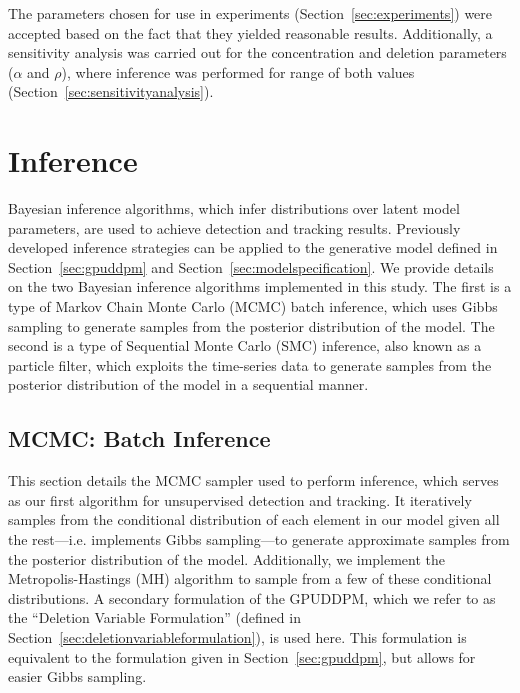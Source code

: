 \documentclass[twocolumn, final]{svjour3}
\begin{document}
The parameters chosen for use in experiments (Section~\ref{sec:experiments}) were accepted based on the fact that they yielded reasonable results. Additionally, a sensitivity analysis was carried out for the concentration and deletion parameters ($\alpha$ and $\rho$), where inference was performed for range of both values (Section~\ref{sec:sensitivityanalysis}).




\section{Inference}
\label{sec:inference}

Bayesian inference algorithms, which infer distributions over latent model parameters, are used to achieve detection and tracking results. Previously developed inference strategies can be applied to the generative model defined in Section~\ref{sec:gpuddpm} and Section~\ref{sec:modelspecification}. We provide details on the two Bayesian inference algorithms implemented in this study. The first is a type of Markov Chain Monte Carlo (MCMC) batch inference, which uses Gibbs sampling to generate samples from the posterior distribution of the model. The second is a type of Sequential Monte Carlo (SMC) inference, also known as a particle filter, which exploits the time-series data to generate samples from the posterior distribution of the model in a sequential manner.


\subsection{MCMC: Batch Inference}
\label{sec:MCMC}

This section details the MCMC sampler used to perform inference, which serves as our first algorithm for unsupervised detection and tracking. It iteratively samples from the conditional distribution of each element in our model given all the rest---i.e. implements Gibbs sampling---to generate approximate samples from the posterior distribution of the model. Additionally, we implement the Metropolis-Hastings (MH) algorithm to sample from a few of these conditional distributions. A secondary formulation of the GPUDDPM, which we refer to as the ``Deletion Variable Formulation'' (defined in Section~\ref{sec:deletionvariableformulation}), is used here. This formulation is equivalent to the formulation given in Section~\ref{sec:gpuddpm}, but allows for easier Gibbs sampling.
\end{document}
